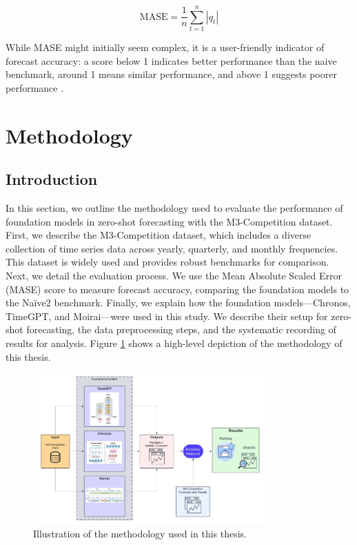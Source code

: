 \documentclass[12pt,a4paper]{article}
\begin{document}
\begin{equation}
  \text{MASE} = \frac{1}{n} \sum_{t=1}^{n} \left| q_t \right|
\end{equation}

While MASE might initially seem complex, it is a user-friendly indicator of forecast accuracy: a score below 1 indicates better performance than the naive benchmark, around 1 means similar performance, and above 1 suggests poorer performance \parencite[684--685]{HyndmanAccuracy2006}.




\newpage
{\centering \section{Methodology} \par}

\subsection{Introduction}

In this section, we outline the methodology used to evaluate the performance of foundation models in zero-shot forecasting with the M3-Competition dataset. First, we describe the M3-Competition dataset, which includes a diverse collection of time series data across yearly, quarterly, and monthly frequencies. This dataset is widely used and provides robust benchmarks for comparison. Next, we detail the evaluation process. We use the Mean Absolute Scaled Error (MASE) score to measure forecast accuracy, comparing the foundation models to the Naïve2 benchmark. Finally, we explain how the foundation models—Chronos, TimeGPT, and Moirai—were used in this study. We describe their setup for zero-shot forecasting, the data preprocessing steps, and the systematic recording of results for analysis. Figure \ref{methodology} shows a high-level depiction of the methodology of this thesis. 


\begin{figure}[htbp]
  \centering
  \includegraphics[width=0.8\textwidth]{method_fig.png}
  \caption{Illustration of the methodology used in this thesis.}
  \label{methodology}
\end{figure}
\end{document}
